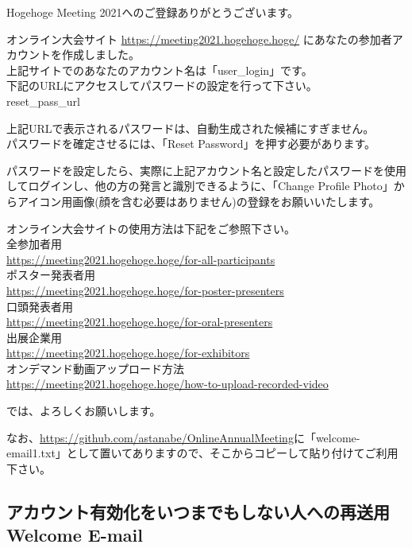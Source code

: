 \documentclass[titlepage,10pt,a4paper,uplatex]{jsbook}
\newenvironment{content}{\begin{shaded}\vspace{-1em}\raggedright\ttfamily\footnotesize\setlength{\baselineskip}{1.4em}}{\end{shaded}\vspace{-1em}}
\begin{document}
\begin{content}
Hogehoge Meeting 2021へのご登録ありがとうございます。

オンライン大会サイト \url{https://meeting2021.hogehoge.hoge/} にあなたの参加者アカウントを作成しました。\\
上記サイトでのあなたのアカウント名は「{\lbrack}user\_login{\rbrack}」です。\\
下記のURLにアクセスしてパスワードの設定を行って下さい。\\
{\lbrack}reset\_pass\_url{\rbrack}

上記URLで表示されるパスワードは、自動生成された候補にすぎません。\\
パスワードを確定させるには、「Reset Password」を押す必要があります。

パスワードを設定したら、実際に上記アカウント名と設定したパスワードを使用してログインし、他の方の発言と識別できるように、「Change Profile Photo」からアイコン用画像(顔を含む必要はありません)の登録をお願いいたします。

オンライン大会サイトの使用方法は下記をご参照下さい。\\
全参加者用\\
\url{https://meeting2021.hogehoge.hoge/for-all-participants}\\
ポスター発表者用\\
\url{https://meeting2021.hogehoge.hoge/for-poster-presenters}\\
口頭発表者用\\
\url{https://meeting2021.hogehoge.hoge/for-oral-presenters}\\
出展企業用\\
\url{https://meeting2021.hogehoge.hoge/for-exhibitors}\\
オンデマンド動画アップロード方法\\
\url{https://meeting2021.hogehoge.hoge/how-to-upload-recorded-video}

では、よろしくお願いします。
\end{content}

なお、\url{https://github.com/astanabe/OnlineAnnualMeeting}に「welcome-email1.txt」として置いてありますので、そこからコピーして貼り付けてご利用下さい。

\subsection{アカウント有効化をいつまでもしない人への再送用Welcome E-mail}
\end{document}
